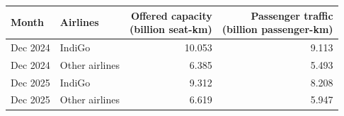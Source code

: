 \begin{tabular}{@{}llrr@{}}
\toprule
Month & Airlines & \shortstack[r]{Offered capacity\\(billion seat-km)} & \shortstack[r]{Passenger traffic\\(billion passenger-km)} \\
\midrule
Dec 2024 & IndiGo & 10.053 & 9.113 \\
Dec 2024 & Other airlines & 6.385 & 5.493 \\
Dec 2025 & IndiGo & 9.312 & 8.208 \\
Dec 2025 & Other airlines & 6.619 & 5.947 \\
\bottomrule
\end{tabular}
